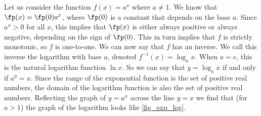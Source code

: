 Let us consider the function $f(x)=a^x$ where $a\neq1$. We know that $\fp(x)=\fp(0)a^x$, where $\fp(0)$ is a constant that depends on the base $a$. Since $a^x>0$ for all $x$, this implies that $\fp(x)$ is either always positive or always negative, depending on the sign of $\fp(0)$. This in turn implies that $f$ is strictly monotonic, so $f$ is one-to-one. We can now say that $f$ has an inverse. We call this inverse the logarithm with base $a$, denoted $f^{-1}(x)=\log_ax$. When $a=e$, this is the natural logarithm function $\ln x$. So we can say that $y=\log_a x$ if and only if $a^y=x$. Since the range of the exponential function is the set of positive real numbers, the domain of the logarithm function is also the set of positive real numbers. Reflecting the graph of $y=a^x$ across the line $y=x$ we find that (for $a>1$) the graph of the logarithm looks like \autoref{fig_exp_log}.


